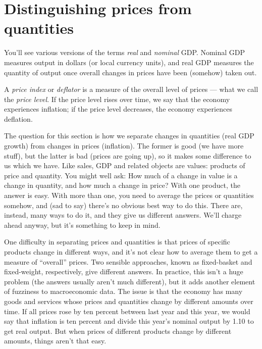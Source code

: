 \section{Distinguishing prices from quantities}


You'll see various versions of the terms {\it real\/} and {\it nominal\/} GDP.
Nominal GDP measures output in dollars (or local currency units), and real GDP measures the quantity of output once overall changes in prices have been
(somehow) taken out.


A {\it price index\/} or {\it deflator\/} is a measure of the
overall level of prices --- what we call the {\it price level\/}.  If the price level rises over time, we say that the economy experiences inflation; if the price level decreases, the economy experiences
deflation.  

The question for this section is how we separate changes in quantities
(real GDP growth) from changes in prices (inflation).
The former is good (we have more stuff), but the latter is bad (prices are going up),
so it makes some difference to us which we have.
Like sales,
GDP and related objects are values: products of price and quantity.
You might well ask:  How much of a change in value is a change
in quantity, and how much a change in price?
With one product, the answer is easy.
With more than one, you need to average the prices or quantities somehow,
and (sad to say) there's no obvious best way to do this.
There are, instead, many ways to do it, and they give us
different answers.
We'll charge ahead anyway, but it's something to keep in mind.


One difficulty in separating prices and quantities
is that prices of specific products change in different ways, and it's not clear how to
average them to get a measure of ``overall'' prices. Two sensible
approaches, known as fixed-basket and fixed-weight, respectively,
give different answers. In practice, this isn't a huge problem (the
answers usually aren't much different), but it adds another
element of fuzziness to macroeconomic data. The issue is that the
economy has many goods and services whose prices and quantities
change by different amounts over time. If all prices rose by ten percent
between last year and this year, we would say that inflation is ten percent and
divide this year's nominal output by 1.10 to get real output. But
when prices of different products change by different amounts,
things aren't that easy.



